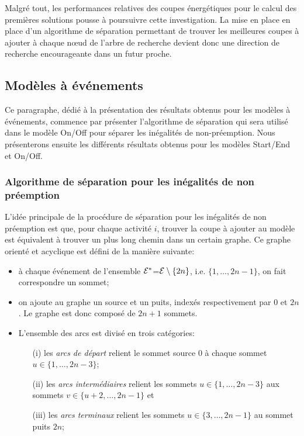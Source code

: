 Malgré tout, les performances relatives des coupes énergétiques pour
le calcul des premières solutions pousse à poursuivre cette
investigation. La mise en place en place d'un algorithme de séparation
permettant de trouver les meilleures coupes à ajouter à chaque n\oe ud
de l'arbre de recherche devient donc une direction de recherche
encourageante dans un futur proche. 

\subsection{Modèles à événements}

Ce paragraphe, dédié à la présentation des résultats obtenus pour les
modèles à événements, commence par présenter l'algorithme de
séparation qui sera utilisé dans le modèle On/Off pour séparer les
inégalités de non-préemption. Nous présenterons ensuite les différents
résultats obtenus pour les modèles Start/End et On/Off. 

\subsubsection{Algorithme de séparation pour les inégalités de non
  préemption} 

L'idée principale de la procédure de séparation pour les inégalités de
non préemption est que, pour chaque activité $i$, trouver la coupe à
ajouter au modèle est équivalent à trouver un plus long chemin dans un
certain graphe. Ce graphe orienté et acyclique est défini de la
manière suivante:
\begin{itemize}
\item à chaque événement de l'ensemble ${\cal E}^*$=${\cal E} \setminus\{2n\}$,
i.e. $\{1,\dots,2n-1\}$, on fait correspondre un sommet;
\item on ajoute au graphe un source et un puits, indexés
respectivement par $0$ et $2n$. Le graphe est donc composé de $2n+1$
sommets.
\item L'ensemble des arcs est divisé en trois catégories:
  \begin{itemize}
  \item[(i)] les {\it arcs de départ} relient le sommet source $0$ à
chaque sommet $u \in \{1,\dots,2n-3\}$;
  \item[(ii)] les {\it arcs intermédiaires} relient les sommets $u \in
\{1,\dots, 2n-3\}$ aux sommets $v \in \{u+2,\dots,2n-1\}$ et
  \item[(iii)] les {\it arcs terminaux} relient les sommets $u \in
\{3,\dots,2n-1\}$ au sommet puits $2n$;
  \end{itemize}
\end{itemize}

